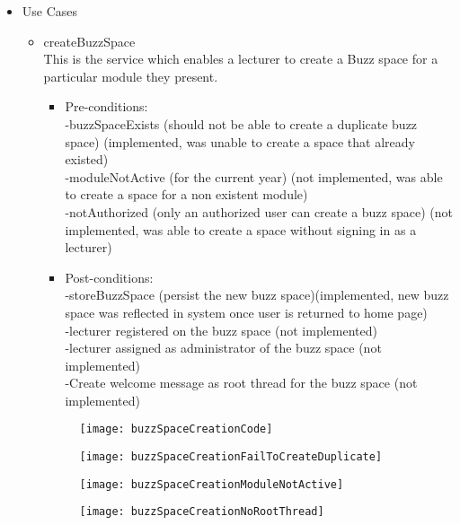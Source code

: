 \begin {itemize}
\item Use Cases
\begin {itemize}
\item {createBuzzSpace}\\
This is the service which enables a lecturer to create a Buzz space for a particular module they present.
\begin {itemize}
\item Pre-conditions:\\
-buzzSpaceExists (should not be able to create a duplicate buzz space) (implemented, was unable to create a space that already existed)\\
-moduleNotActive (for the current year) (not implemented, was able to create a space for a non existent module)\\
-notAuthorized (only an authorized user can create a buzz space) (not implemented, was able to create a space without signing in as a lecturer)\\

\item Post-conditions:\\
-storeBuzzSpace (persist the new buzz space)(implemented, new buzz space was reflected in system once user is returned to home page)\\
-lecturer registered on the buzz space (not implemented)\\
-lecturer assigned as administrator of the buzz space (not implemented)\\
-Create welcome message as root thread for the buzz space (not implemented)\\
\end {itemize}

\begin{figure}[h!]
  \centering
    \texttt{[image: buzzSpaceCreationCode]} 
\end{figure}

\begin{figure}[h!]
  \centering
    \texttt{[image: buzzSpaceCreationFailToCreateDuplicate]} 
\end{figure}

\begin{figure}[h!]
  \centering
    \texttt{[image: buzzSpaceCreationModuleNotActive]} 
\end{figure}

\begin{figure}[h!]
  \centering
    \texttt{[image: buzzSpaceCreationNoRootThread]} 
\end{figure}



\end{itemize}
\end{itemize}
